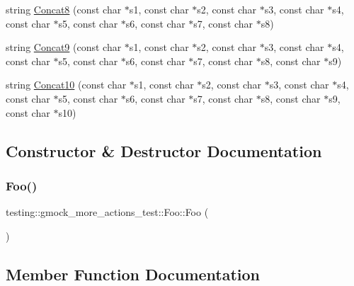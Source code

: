 \begin{DoxyCompactItemize}
\item 
string \hyperlink{classtesting_1_1gmock__more__actions__test_1_1_foo_a8457ede63aec737d6e7c42b3c11b993a}{Concat8} (const char $\ast$s1, const char $\ast$s2, const char $\ast$s3, const char $\ast$s4, const char $\ast$s5, const char $\ast$s6, const char $\ast$s7, const char $\ast$s8)
\item 
string \hyperlink{classtesting_1_1gmock__more__actions__test_1_1_foo_a96946ff77b6fa4f1d333592bc18e37e4}{Concat9} (const char $\ast$s1, const char $\ast$s2, const char $\ast$s3, const char $\ast$s4, const char $\ast$s5, const char $\ast$s6, const char $\ast$s7, const char $\ast$s8, const char $\ast$s9)
\item 
string \hyperlink{classtesting_1_1gmock__more__actions__test_1_1_foo_ac9c9711d423f0125fb46f468a04862fd}{Concat10} (const char $\ast$s1, const char $\ast$s2, const char $\ast$s3, const char $\ast$s4, const char $\ast$s5, const char $\ast$s6, const char $\ast$s7, const char $\ast$s8, const char $\ast$s9, const char $\ast$s10)
\end{DoxyCompactItemize}


\subsection{Constructor \& Destructor Documentation}
\mbox{\label{classtesting_1_1gmock__more__actions__test_1_1_foo_ad2603a65b94e019c75f4227787b9177e}} 
\subsubsection{\texorpdfstring{Foo()}{Foo()}}
{\footnotesize\ttfamily testing\+::gmock\+\_\+more\+\_\+actions\+\_\+test\+::\+Foo\+::\+Foo (\begin{DoxyParamCaption}{ }\end{DoxyParamCaption})\hspace{0.3cm}{\ttfamily [inline]}}



\subsection{Member Function Documentation}
\mbox{\label{classtesting_1_1gmock__more__actions__test_1_1_foo_a15d8082ba501899c8ac1d93543ed9ad3}} 
